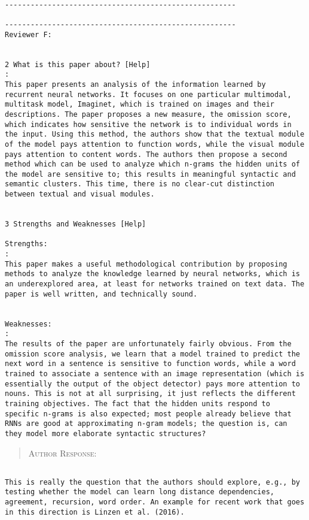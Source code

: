 \begin{verbatim}

------------------------------------------------------

------------------------------------------------------
Reviewer F:


2 What is this paper about? [Help]
: 
This paper presents an analysis of the information learned by
recurrent neural networks. It focuses on one particular multimodal,
multitask model, Imaginet, which is trained on images and their
descriptions. The paper proposes a new measure, the omission score,
which indicates how sensitive the network is to individual words in
the input. Using this method, the authors show that the textual module
of the model pays attention to function words, while the visual module
pays attention to content words. The authors then propose a second
method which can be used to analyze which n-grams the hidden units of
the model are sensitive to; this results in meaningful syntactic and
semantic clusters. This time, there is no clear-cut distinction
between textual and visual modules.


3 Strengths and Weaknesses [Help]

Strengths:
: 
This paper makes a useful methodological contribution by proposing
methods to analyze the knowledge learned by neural networks, which is
an underexplored area, at least for networks trained on text data. The
paper is well written, and technically sound.


Weaknesses:
: 
The results of the paper are unfortunately fairly obvious. From the
omission score analysis, we learn that a model trained to predict the
next word in a sentence is sensitive to function words, while a word
trained to associate a sentence with an image representation (which is
essentially the output of the object detector) pays more attention to
nouns. This is not at all surprising, it just reflects the different
training objectives. The fact that the hidden units respond to
specific n-grams is also expected; most people already believe that
RNNs are good at approximating n-gram models; the question is, can
they model more elaborate syntactic structures?
\end{verbatim}  
\begin{quote}
\textsc{Author Response:}  
\end{quote}
\begin{verbatim}

This is really the question that the authors should explore, e.g., by
testing whether the model can learn long distance dependencies,
agreement, recursion, word order. An example for recent work that goes
in this direction is Linzen et al. (2016).
\end{verbatim}  
